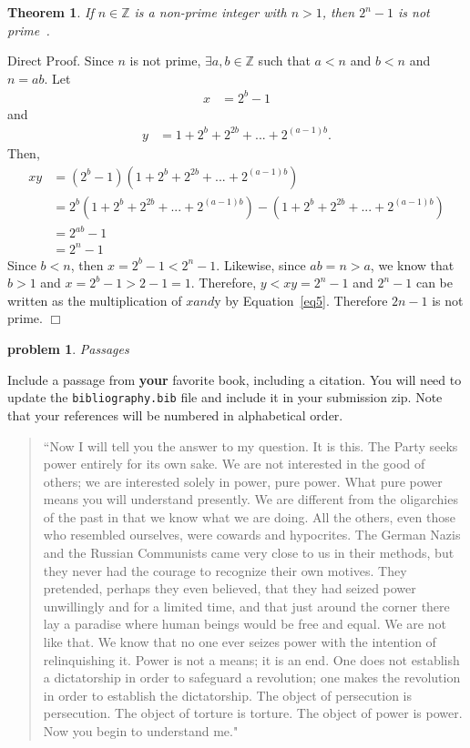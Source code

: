 \documentclass[10pt]{article}
\newenvironment{proof}{\par\noindent{\it Proof.}\hspace*{1em}}{$\Box$\bigskip}
\newtheorem{problem}{\sc\color{cit}problem}
\newtheorem{theorem}{Theorem}
\newcommand{\Z}{\mathbb{Z}} %
\begin{document}
\begin{theorem}
    If $n \in \Z$ is a non-prime integer with $n>1$, then $2^n - 1$ is not prime~\cite{velleman}.
\end{theorem}

\begin{proof}
    Direct Proof. Since $n$ is not prime, $\exists a, b \in \Z$ such that $a < n$ and $b < n$ and $n = ab$. Let
    \begin{align*}
        x &= 2^b -1
    \end{align*}
    and
    \begin{align*}
        y &= 1 + 2^b + 2^{2b} + ... + 2^{(a-1)b}.
    \end{align*}
    Then,
    \begin{align}
        \label{eq2}
        xy &= (2^b -1)(1 + 2^b + 2^{2b} + ... + 2^{(a-1)b})\\
        \label{eq3}
           &= 2^b(1 + 2^b + 2^{2b} + ... + 2^{(a-1)b}) - (1 + 2^b + 2^{2b} + ... + 2^{(a-1)b})\\
        \label{eq4}
           &= 2^{ab}-1\\
        \label{eq5}
           &= 2^n -1
    \end{align}
    Since $b < n$, then $x = 2^b - 1 < 2^n - 1$. Likewise, since $ab = n > a$, we know that $b > 1$ and $x = 2^b - 1 > 2 - 1 = 1$. Therefore, $y < xy = 2^n - 1$ and $2^n - 1$ can be written as the multiplication of $x and $y by Equation~\ref{eq5}. Therefore $2n - 1$ is not prime.
\end{proof}

\begin{problem} Passages \end{problem}
    Include a passage from \textbf{your} favorite book, including a citation.  You will need to update the \verb|bibliography.bib| file and include it in your submission zip. Note that your references will be numbered in alphabetical order.
    \begin{quote}
    “Now I will tell you the answer to my question. It is this. The Party seeks power entirely for its own sake. We are not interested in the good of others; we are interested solely in power, pure power. What pure power means you will understand presently. We are different from the oligarchies of the past in that we know what we are doing. All the others, even those who resembled ourselves, were cowards and hypocrites. The German Nazis and the Russian Communists came very close to us in their methods, but they never had the courage to recognize their own motives. They pretended, perhaps they even believed, that they had seized power unwillingly and for a limited time, and that just around the corner there lay a paradise where human beings would be free and equal. We are not like that. We know that no one ever seizes power with the intention of relinquishing it. Power is not a means; it is an end. One does not establish a dictatorship in order to safeguard a revolution; one makes the revolution in order to establish the dictatorship. The object of persecution is persecution. The object of torture is torture. The object of power is power. Now you begin to understand me." ~\cite{orwell}
    \end{quote}
\end{document}
